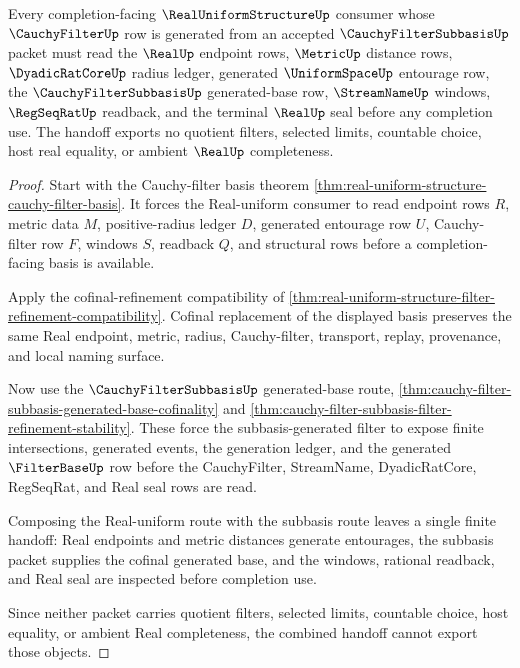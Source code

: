 \begin{theorem}
\label{thm:real-uniform-structure-subbasis-completion-handoff}
Every completion-facing $\RealUniformStructureUp$ consumer whose $\CauchyFilterUp$ row is generated from an accepted $\CauchyFilterSubbasisUp$ packet must read the $\RealUp$ endpoint rows, $\MetricUp$ distance rows, $\DyadicRatCoreUp$ radius ledger, generated $\UniformSpaceUp$ entourage row, the $\CauchyFilterSubbasisUp$ generated-base row, $\StreamNameUp$ windows, $\RegSeqRatUp$ readback, and the terminal $\RealUp$ seal before any completion use. The handoff exports no quotient filters, selected limits, countable choice, host real equality, or ambient $\RealUp$ completeness.
\end{theorem}
\begin{proof}
Start with the Cauchy-filter basis theorem \autoref{thm:real-uniform-structure-cauchy-filter-basis}. It forces the Real-uniform consumer to read endpoint rows $R$, metric data $M$, positive-radius ledger $D$, generated entourage row $U$, Cauchy-filter row $F$, windows $S$, readback $Q$, and structural rows before a completion-facing basis is available.

Apply the cofinal-refinement compatibility of \autoref{thm:real-uniform-structure-filter-refinement-compatibility}. Cofinal replacement of the displayed basis preserves the same Real endpoint, metric, radius, Cauchy-filter, transport, replay, provenance, and local naming surface.

Now use the $\CauchyFilterSubbasisUp$ generated-base route, \autoref{thm:cauchy-filter-subbasis-generated-base-cofinality} and \autoref{thm:cauchy-filter-subbasis-filter-refinement-stability}. These force the subbasis-generated filter to expose finite intersections, generated events, the generation ledger, and the generated $\FilterBaseUp$ row before the CauchyFilter, StreamName, DyadicRatCore, RegSeqRat, and Real seal rows are read.

Composing the Real-uniform route with the subbasis route leaves a single finite handoff: Real endpoints and metric distances generate entourages, the subbasis packet supplies the cofinal generated base, and the windows, rational readback, and Real seal are inspected before completion use.

Since neither packet carries quotient filters, selected limits, countable choice, host equality, or ambient Real completeness, the combined handoff cannot export those objects.
\end{proof}

